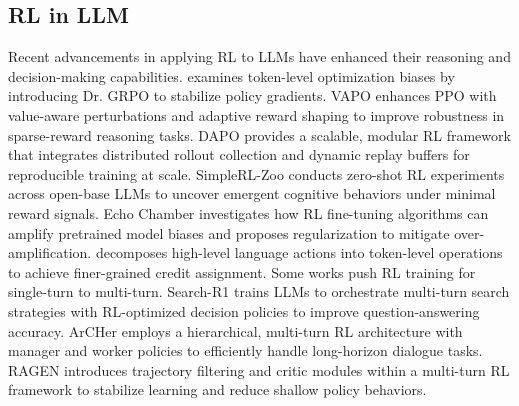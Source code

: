 \subsection{RL in LLM}
\label{related_work:rl_in_llm}
Recent advancements in applying RL to LLMs have enhanced their reasoning and decision-making capabilities.
\citet{DBLP:journals/corr/abs-2503-20783} examines token-level optimization biases by introducing Dr. GRPO to stabilize policy gradients.
VAPO \citep{yue2025vapo} enhances PPO with value-aware perturbations and adaptive reward shaping to improve robustness in sparse-reward reasoning tasks.
DAPO \citep{yu2025dapo} provides a scalable, modular RL framework that integrates distributed rollout collection and dynamic replay buffers for reproducible training at scale.
SimpleRL-Zoo \citep{zeng2025simplerlzoo} conducts zero-shot RL experiments across open-base LLMs to uncover emergent cognitive behaviors under minimal reward signals.
Echo Chamber \citep{zhao2025echo} investigates how RL fine-tuning algorithms can amplify pretrained model biases and proposes regularization to mitigate over-amplification.
\citet{DBLP:journals/corr/abs-2405-15821} decomposes high-level language actions into token-level operations to achieve finer-grained credit assignment.
Some works push RL training for single-turn to multi-turn.
Search-R1 \citep{jin2025searchr1} trains LLMs to orchestrate multi-turn search strategies with RL-optimized decision policies to improve question-answering accuracy.
ArCHer \citep{zhou2024archer} employs a hierarchical, multi-turn RL architecture with manager and worker policies to efficiently handle long-horizon dialogue tasks.
RAGEN \citep{wang2025ragen} introduces trajectory filtering and critic modules within a multi-turn RL framework to stabilize learning and reduce shallow policy behaviors.




